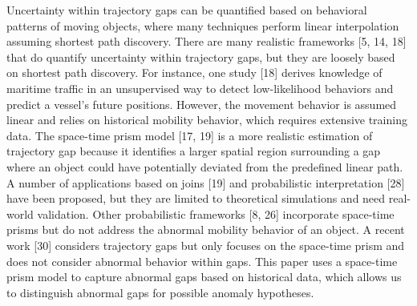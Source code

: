 \documentclass[twoside,leqno,onecolumn]{article}
\begin{document}
Uncertainty within trajectory gaps can be quantified based on behavioral patterns of moving objects, where many techniques perform linear interpolation assuming shortest path discovery. There are many realistic frameworks [5, 14, 18] that do quantify uncertainty within trajectory gaps, but they are loosely based on shortest path discovery. For instance, one study [18] derives knowledge of maritime traffic in an unsupervised way to detect low-likelihood behaviors and predict a vessel's future positions. However, the movement behavior is assumed linear and relies on historical mobility behavior, which requires extensive training data. The space-time prism model [17, 19] is a more realistic estimation of trajectory gap because it identifies a larger spatial region surrounding a gap where an object could have potentially deviated from the predefined linear path. A number of applications based on joins [19] and probabilistic interpretation [28] have been proposed, but they are limited to theoretical simulations and need real-world validation. Other probabilistic frameworks [8, 26] incorporate space-time prisms but do not address the abnormal mobility behavior of an object. A recent work [30] considers trajectory gaps but only focuses on the space-time prism and does not consider abnormal behavior within gaps. This paper uses a space-time prism model to capture abnormal gaps based on historical data, which allows us to distinguish abnormal gaps for possible anomaly hypotheses.
\end{document}
